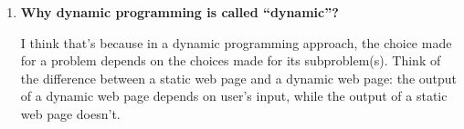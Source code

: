 \documentclass{article}
\begin{document}
\begin{enumerate}

\item

\textbf{Why dynamic programming is called ``dynamic''?}

I think that's because in a dynamic programming approach, the choice
made for a problem depends on the choices made for its subproblem(s).
Think of the difference between a static web page and a dynamic web
page: the output of a dynamic web page depends on user's input, while
the output of a static web page doesn't.

\end{enumerate}
\end{document}
